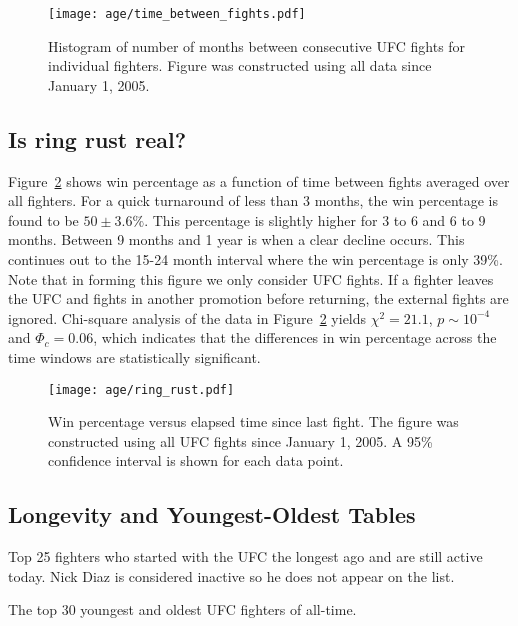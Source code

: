 \begin{figure}[h]
\begin{center}
\texttt{[image: age/time\_between\_fights.pdf]}
\caption{Histogram of number of months between consecutive UFC fights
for individual fighters. Figure was constructed using all data since
January 1, 2005.}
\label{time_between_fights}
\end{center}
\end{figure}

\subsection*{Is ring rust real?}
Figure~\ref{ring_rust} shows win percentage as a function
of time between fights averaged over all fighters.
For a quick turnaround of less than 3 months, the win percentage
is found to be $50\pm3.6\%$. This percentage is slightly
higher for 3 to 6 and 6 to 9 months.  Between 9 months
and 1 year is when a clear decline occurs. This continues
out to the 15-24 month interval where the win percentage
is only 39\%.
Note that in forming this figure we only consider UFC fights. If a fighter
leaves the UFC and fights in another promotion before returning, the
external fights are ignored. Chi-square analysis of the
data in Figure~\ref{ring_rust} yields
$\chi^2=21.1$, $p \sim 10^{-4}$ and $\Phi_c=0.06$, which
indicates that the differences in win percentage across the
time windows are statistically significant.

\begin{figure}[h]
\begin{center}
\texttt{[image: age/ring\_rust.pdf]}
\caption{Win percentage versus elapsed time since last fight. The figure
was constructed using all UFC fights since January 1, 2005. A
95\% confidence interval is shown for each data point.}
\label{ring_rust}
\end{center}
\end{figure}

\clearpage
\subsection*{Longevity and Youngest-Oldest Tables}

\begin{center}
\begin{table}[h]

\caption{Top 25 fighters who started with the UFC the longest ago and are still active today. Nick Diaz
is considered inactive so he does not appear on the list.}
\end{table}
\end{center}

\begin{center}
\begin{table}[h]

\caption{The top 30 youngest and oldest UFC fighters of all-time.}
\end{table}
\end{center}
